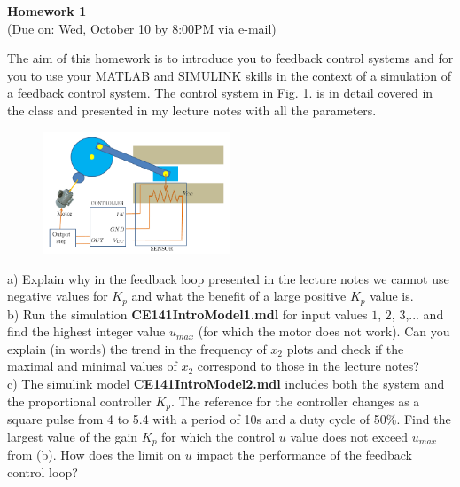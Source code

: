 \documentclass{article}
\begin{document}
 
\begin{center}
{\bf \Large  Homework 1} \\
(Due on: Wed, October 10 by 8:00PM via e-mail)
\end{center}

\noindent  The aim of this homework is to introduce you to feedback control systems and for you to use your MATLAB and SIMULINK skills in the context of a simulation of a feedback control system. The control system in Fig. 1. is in detail covered in the class and presented in my lecture notes with all the parameters. \\

\begin{figure}[h]
\begin{center}
\includegraphics[width=0.5\textwidth]{Fig1.png}
\end{center}
\vspace{-0.6cm}
\caption{}
\end{figure}

\noindent a) Explain why in the feedback loop presented in the lecture notes we cannot use negative values for $K_p$ and what the benefit of a large positive $K_p$ value is. \\

\noindent b) Run the simulation {\bf CE141IntroModel1.mdl} for input values $1$, $2$, $3$,... and find the highest integer value $u_{max}$ (for which the motor does not work). Can you explain (in words) the trend in the frequency of $x_2$ plots and check if the maximal and minimal values of $x_2$ correspond to those in the lecture notes? \\

\noindent c) The simulink model {\bf CE141IntroModel2.mdl} includes
both the system and the proportional controller $K_p$. The reference
for the controller changes as a square pulse from 4 to 5.4 with a period of 10s and a duty cycle of 50\%. Find the largest value of the gain $K_p$ for which the control $u$ value does not exceed $u_{max}$ from (b). How does the limit on $u$ impact the performance of the feedback control loop? \\
\end{document}
